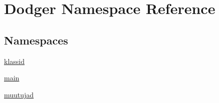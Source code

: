 \hypertarget{namespace_dodger}{}\section{Dodger Namespace Reference}
\label{namespace_dodger}
\subsection*{Namespaces}
\begin{DoxyCompactItemize}
\item 
 \hyperlink{namespace_dodger_1_1klassid}{klassid}
\item 
 \hyperlink{namespace_dodger_1_1main}{main}
\item 
 \hyperlink{namespace_dodger_1_1muutujad}{muutujad}
\end{DoxyCompactItemize}
